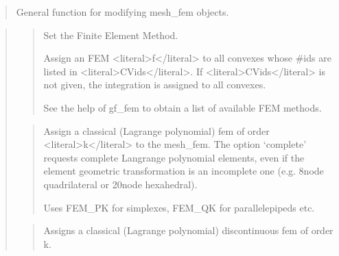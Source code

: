 \documentclass[a4paper,11pt,english]{sphinxmanual}
\begin{document}
\sphinxAtStartPar
{}
\begin{quote}

\sphinxAtStartPar
General function for modifying mesh\_fem objects.
\end{quote}

\sphinxAtStartPar
{}
\begin{quote}

\sphinxAtStartPar
{}
\begin{quote}

\sphinxAtStartPar
Set the Finite Element Method.

\sphinxAtStartPar
Assign an FEM \textless{}literal\textgreater{}f\textless{}/literal\textgreater{} to all convexes whose \#ids are listed in \textless{}literal\textgreater{}CVids\textless{}/literal\textgreater{}.
If \textless{}literal\textgreater{}CVids\textless{}/literal\textgreater{} is not given, the integration is assigned to all convexes.

\sphinxAtStartPar
See the help of gf\_fem to obtain a list of available FEM methods.
\end{quote}

\sphinxAtStartPar
{}
\begin{quote}

\sphinxAtStartPar
Assign a classical (Lagrange polynomial) fem of order \textless{}literal\textgreater{}k\textless{}/literal\textgreater{} to the mesh\_fem.
The option ‘complete’ requests complete Langrange polynomial elements,
even if the element geometric transformation is an incomplete one
(e.g. 8\sphinxhyphen{}node quadrilateral or 20\sphinxhyphen{}node hexahedral).

\sphinxAtStartPar
Uses FEM\_PK for simplexes, FEM\_QK for parallelepipeds etc.
\end{quote}

\sphinxAtStartPar
{}
\begin{quote}

\sphinxAtStartPar
Assigns a classical (Lagrange polynomial) discontinuous fem of order k.


\end{quote}
\end{quote}
\end{document}
